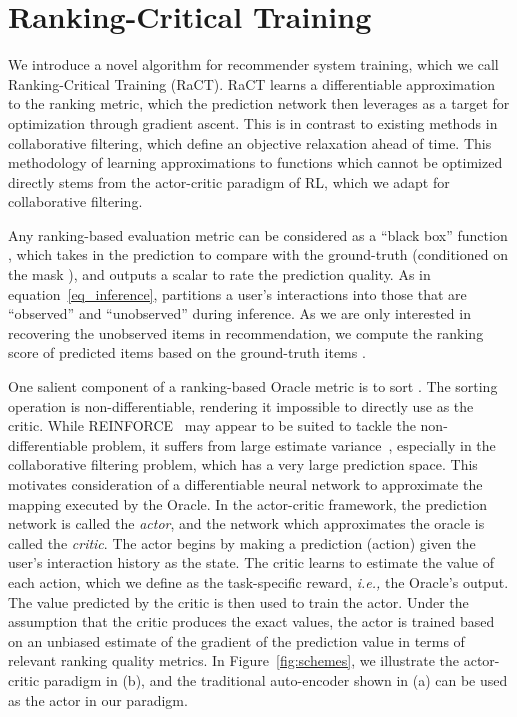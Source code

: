 \documentclass{article} \usepackage{iclr2020_conference,times}
\def\eqref#1{equation~\ref{#1}}
\newcommand{\ie}[0]{\emph{i.e., }}
\begin{document}
\vspace{-3mm}
\section{Ranking-Critical Training}
\vspace{-3mm}

We introduce a novel algorithm for recommender system training, which we call Ranking-Critical Training (RaCT). RaCT learns a differentiable approximation to the ranking metric, which the prediction network then leverages as a target for optimization through gradient ascent. This is in contrast to existing methods in collaborative filtering, which define an objective relaxation ahead of time. This methodology of learning approximations to functions which cannot be optimized directly stems from the actor-critic paradigm of RL, which we adapt for collaborative filtering.

Any ranking-based evaluation metric can be considered as a ``black box'' function , which takes in the prediction  to compare with the ground-truth  (conditioned on the mask ), and outputs a scalar  to rate the prediction quality.
As in \eqref{eq_inference},  partitions a user's interactions into those that are ``observed'' and ``unobserved'' during inference.
As we are only interested in recovering the unobserved items in recommendation, we compute the ranking score of predicted items  based on the ground-truth items .

One salient component of a ranking-based Oracle metric  is to sort . The sorting operation is non-differentiable, rendering it impossible to directly use  as the critic.
While REINFORCE~\citep{williams1992simple} may appear to be suited to tackle the non-differentiable problem, it suffers from large estimate variance~\citep{silver2014deterministic}, especially in the collaborative filtering problem, which has a very large prediction space. This motivates consideration of a differentiable neural network to approximate the mapping executed by the Oracle.
In the actor-critic framework, the prediction network is called the \textit{actor}, and the network which approximates the oracle is called the \textit{critic}. The actor begins by making a prediction (action) given the user's interaction history as the state. The critic learns to estimate the value of each action, which we define as the task-specific reward, \ie the Oracle's output.
The value predicted by the critic is then used to train the actor.
Under the assumption that the critic produces the exact values, the actor is trained based on an unbiased estimate of the gradient of the prediction value in terms of relevant ranking quality metrics.
In Figure~\ref{fig:schemes}, we illustrate the actor-critic paradigm in (b), and the traditional auto-encoder shown in (a) can be used as the actor in our paradigm.
\end{document}
